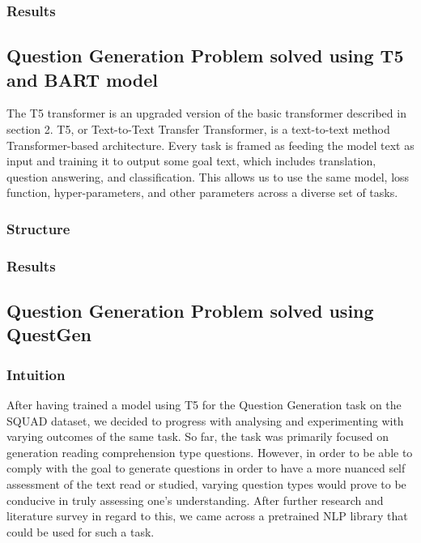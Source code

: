 \documentclass[oneside,a4paper]{article}
\begin{document}
\subsubsection{Results}
\subsection{Question Generation Problem solved using T5 and BART model}
The T5 transformer is an upgraded version of the basic transformer described in section 2. T5, or Text-to-Text Transfer Transformer, is a text-to-text method Transformer-based architecture. Every task is framed as feeding the model text as input and training it to output some goal text, which includes translation, question answering, and classification. This allows us to use the same model, loss function, hyper-parameters, and other parameters across a diverse set of tasks.
\subsubsection{Structure}
\subsubsection{Results}                                                     


\subsection{Question Generation Problem solved using QuestGen}
\subsubsection{Intuition}
After having trained a model using T5 for the Question Generation task on the SQUAD dataset, we decided to progress with analysing and experimenting with varying outcomes of the same task. So far, the task was primarily focused on generation reading comprehension type questions. However, in order to be able to comply with the goal to generate questions in order to have a more nuanced self assessment of the text read or studied, varying question types would prove to be conducive in truly assessing one's understanding. After further research and literature survey in regard to this, we came across a pretrained NLP library that could be used for such a task.
\end{document}

